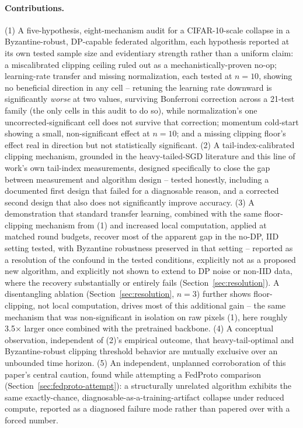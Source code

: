 \documentclass{article}
\begin{document}
\paragraph{Contributions.} (1) A five-hypothesis, eight-mechanism audit for a
CIFAR-10-scale collapse in a Byzantine-robust, DP-capable federated algorithm,
each hypothesis reported at its own tested sample size and evidentiary
strength rather than a uniform claim: a miscalibrated clipping ceiling ruled
out as a mechanistically-proven no-op; learning-rate transfer and missing
normalization, each tested at $n{=}10$, showing no beneficial direction in any
cell -- retuning the learning rate downward is significantly \emph{worse} at
two values, surviving Bonferroni correction across a 21-test family (the only
cells in this audit to do so), while normalization's one uncorrected-significant
cell does not survive that correction; momentum cold-start showing a small,
non-significant effect at $n{=}10$; and a missing clipping floor's effect real
in direction but not statistically significant. (2) A tail-index-calibrated clipping mechanism, grounded in the
heavy-tailed-SGD literature and this line of work's own tail-index measurements,
designed specifically to close the gap between measurement and algorithm design
-- tested honestly, including a documented first design that failed for a
diagnosable reason, and a corrected second design that also does not
significantly improve accuracy. (3) A demonstration that standard transfer
learning, combined with the same floor-clipping mechanism from (1) and
increased local computation, applied at matched round budgets,
recover most of the apparent gap in the no-DP, IID setting tested, with
Byzantine robustness preserved in that setting -- reported as a resolution of
the confound in the tested conditions, explicitly not as a proposed new
algorithm, and explicitly not shown to extend to DP noise or non-IID data,
where the recovery substantially or entirely fails (Section~\ref{sec:resolution}).
A disentangling ablation (Section~\ref{sec:resolution}, $n{=}3$) further shows
floor-clipping, not local computation, drives most of this additional gain --
the same mechanism that was non-significant in isolation on raw pixels (1),
here roughly 3.5$\times$ larger once combined with the pretrained backbone.
(4) A conceptual observation, independent of (2)'s
empirical outcome, that heavy-tail-optimal and Byzantine-robust clipping
threshold behavior are mutually exclusive over an unbounded time horizon. (5) An
independent, unplanned corroboration of this paper's central caution, found
while attempting a FedProto comparison (Section~\ref{sec:fedproto-attempt}): a
structurally unrelated algorithm exhibits the same exactly-chance,
diagnosable-as-a-training-artifact collapse under reduced compute, reported as
a diagnosed failure mode rather than papered over with a forced number.
\end{document}
